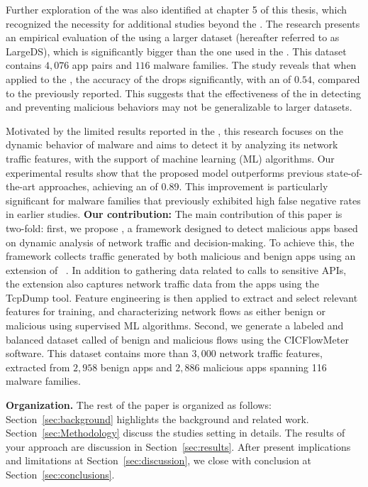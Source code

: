 Further exploration of the \mas was also identified at chapter 5 of this thesis, which recognized the necessity for additional studies beyond the \blls. The research presents an empirical evaluation of the \mas using a larger dataset (hereafter referred to as LargeDS), which is significantly bigger than the one used in the \blls. This dataset contains $4,076$ app pairs and $116$ malware families. The study reveals that when applied to the \cds, the accuracy of the \mas drops significantly, with an \fone of $0.54$, compared to the previously reported. This suggests that the effectiveness of the \mas in detecting and preventing malicious behaviors may not be generalizable to larger datasets. 

Motivated by the limited results reported in the \blls, this research focuses on the dynamic behavior of malware and aims to detect it by analyzing its network traffic features, with the support of machine learning (ML) algorithms. Our experimental results show that the proposed model outperforms previous state-of-the-art approaches, achieving an \fone of 0.89. This improvement is particularly significant for malware families that previously exhibited high false negative rates in earlier studies.\newline
\textbf{Our contribution:} The main contribution of this paper is two-fold: first, we propose \droidxpflow, a framework designed to detect malicious apps based on dynamic analysis of network traffic and decision-making. To achieve this, the framework collects traffic generated by both malicious and benign apps using an extension of \droidxp~\cite{DBLP:conf/scam/CostaMCMVBC20}. In addition to gathering data related to calls to sensitive APIs, the \droidxp extension also captures network traffic data from the apps using the TcpDump tool. Feature engineering is then applied to extract and select relevant features for training, and characterizing network flows as either benign or malicious using supervised ML algorithms. Second, we generate a labeled and balanced dataset called \fds of benign and malicious flows using the CICFlowMeter~\cite{DBLP:conf/icissp/LashkariDMG17} software. This dataset contains more than $3,000$ network traffic features, extracted from $2,958$ benign apps and $2,886$ malicious apps spanning 116 malware families.\newline\newline

\textbf{Organization.} The rest of the paper is organized as follows: Section~\ref{sec:background} highlights the background and related work. Section~\ref{sec:Methodology} discuss the studies setting in details. The results of your approach are discussion in Section~\ref{sec:results}. After present implications and limitations at Section~\ref{sec:discussion}, we close with conclusion at Section~\ref{sec:conclusions}.


